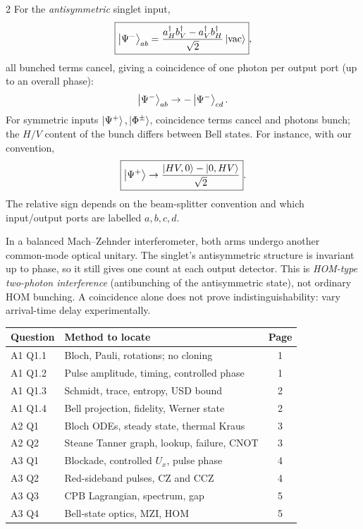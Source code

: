 \begin{multicols}{2}
For the \emph{antisymmetric} singlet input,
\[\boxed{\left\lvert \Psi^-\right\rangle_{ab}=\frac{a_H^\dagger b_V^\dagger-a_V^\dagger b_H^\dagger}{\sqrt2}\left\lvert \rm vac\right\rangle},\]
all bunched terms cancel, giving a coincidence of one photon per output port (up to an overall phase):
\[\left\lvert \Psi^-\right\rangle_{ab}\to-\left\lvert \Psi^-\right\rangle_{cd}.\]
For symmetric inputs $\left\lvert \Psi^+\right\rangle,\left\lvert \Phi^\pm\right\rangle$, coincidence terms cancel and photons bunch; the $H/V$ content of the bunch differs between Bell states. For instance, with our convention,
\[\boxed{\left\lvert \Psi^+\right\rangle\to\frac{\left\lvert HV,0\right\rangle-\left\lvert 0,HV\right\rangle}{\sqrt2}}.\]
The relative sign depends on the beam-splitter convention and which input/output ports are labelled $a,b,c,d$.

In a balanced Mach--Zehnder interferometer, both arms undergo another common-mode optical unitary. The singlet's antisymmetric structure is invariant up to phase, so it still gives one count at each output detector. This is \emph{HOM-type two-photon interference} (antibunching of the antisymmetric state), not ordinary HOM bunching. A coincidence alone does not prove indistinguishability: vary arrival-time delay experimentally.

\begin{center}\footnotesize
\begin{tabularx}{\linewidth}{@{}p{22mm}Xc@{}}\toprule
Question&Method to locate&Page\\\midrule
A1 Q1.1&Bloch, Pauli, rotations; no cloning&1\\
A1 Q1.2&Pulse amplitude, timing, controlled phase&1\\
A1 Q1.3&Schmidt, trace, entropy, USD bound&2\\
A1 Q1.4&Bell projection, fidelity, Werner state&2\\
A2 Q1&Bloch ODEs, steady state, thermal Kraus&3\\
A2 Q2&Steane Tanner graph, lookup, failure, CNOT&3\\
A3 Q1&Blockade, controlled $U_x$, pulse phase&4\\
A3 Q2&Red-sideband pulses, CZ and CCZ&4\\
A3 Q3&CPB Lagrangian, spectrum, gap&5\\
A3 Q4&Bell-state optics, MZI, HOM&5\\\bottomrule
\end{tabularx}
\end{center}
\end{multicols}